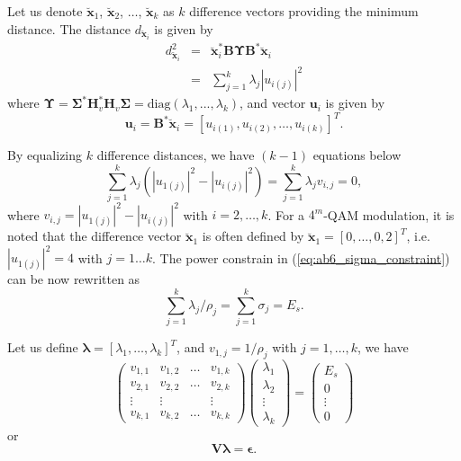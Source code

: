 Let us denote $\breve{\mathbf{x}}_1$, $\breve{\mathbf{x}}_2$, $\hdots$, $\breve{\mathbf{x}}_k$ as $k$ difference vectors providing the minimum distance. The distance $d_{\breve{\mathbf{x}}_i}$ is given by
\begin{eqnarray}
	d_{\breve{\mathbf{x}}_i}^2 & = & \breve{\mathbf{x}}_i^*\mathbf{B}  \mathbf{\Upsilon}  \mathbf{B}^* \breve{\mathbf{x}}_i \nonumber \\ 
	& = & \sum_{j=1}^k \lambda_j |u_{i(j)}|^2
\end{eqnarray}
where $\mathbf{\Upsilon} = \mathbf{\Sigma}^* \mathbf{H}_v^* \mathbf{H}_v \mathbf{\Sigma} = \text{diag} (\lambda_1,..., \lambda_k)$, and vector $\mathbf{u}_i$ is given by
\begin{equation}
	\mathbf{u}_i = \mathbf{B}^* \breve{\mathbf{x}}_i = [u_{i(1)}, u_{i(2)}, \hdots, u_{i(k)}] ^T .
\end{equation}

By equalizing $k$ difference distances, we have $(k-1)$ equations below
\begin{equation}
	\sum_{j=1}^k \lambda_j \left( |u_{1(j)}|^2 - |u_{i(j)}|^2 \right)=\sum_{j=1}^k \lambda_j v_{i,j} = 0 ,
\end{equation}
where $v_{i,j} =  |u_{1(j)}|^2 - |u_{i(j)}|^2$ with $i=2, \hdots,k$. For a $4^m$-QAM modulation, it is noted that the difference vector $\breve{\mathbf{x}}_1$ is often defined by $\breve{\mathbf{x}}_1 = [0,\hdots, 0, 2]^T$, i.e.  $|u_{1(j)}|^2 = 4$ with $j=1\hdots k$. The power constrain in (\ref{eq:ab6_sigma_constraint}) can be now rewritten as
\begin{equation}
	\sum_{j=1}^k \lambda_j / \rho_j = \sum_{j=1}^k \sigma_j = E_s .
\end{equation}

Let us define $\mathbf{\lambda} = [\lambda_1,\hdots, \lambda_k] ^T$, and $v_{1,j} = 1/ \rho_j$ with $j=1, \hdots,k$, we have
\begin{equation}
	\begin{pmatrix}
		v_{1,1} & v_{1,2} & \hdots & v_{1,k}  \\
		v_{2,1} & v_{2,2} & \hdots & v_{2,k}  \\
		\vdots & \vdots & & \vdots  \\
		v_{k,1} & v_{k,2} & \hdots & v_{k,k} 
	\end{pmatrix}
	\begin{pmatrix}
		\lambda_1  \\
		\lambda_2  \\
		\vdots  \\
		\lambda_k
	\end{pmatrix} = 
	\begin{pmatrix}
		E_s  \\
		0  \\
		\vdots  \\
		0
	\end{pmatrix}
\end{equation}
or 
\begin{equation}
	\mathbf{V} \mathbf{\lambda} = \mathbf{\epsilon} .
\end{equation}

